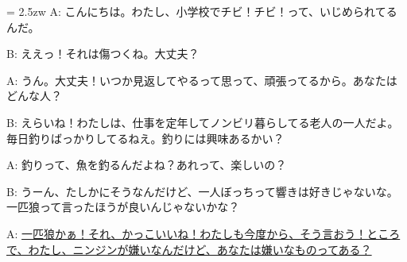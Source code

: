 \documentclass[11pt]{amsart}
\title{}
\author{}
\newenvironment{hangall}[1]{\hangindent = 2.5zw\everypar{\hangindent = 2.5zw}}{}
\begin{document}
\maketitle
\begin{hangall}{}%
A: こんにちは。わたし、小学校でチビ！チビ！って、いじめられてるんだ。

B: ええっ！それは傷つくね。大丈夫？

A: うん。大丈夫！いつか見返してやるって思って、頑張ってるから。あなたはどんな人？

B: えらいね！わたしは、仕事を定年してノンビリ暮らしてる老人の一人だよ。毎日釣りばっかりしてるねえ。釣りには興味あるかい？

A: 釣りって、魚を釣るんだよね？あれって、楽しいの？

B: うーん、たしかにそうなんだけど、一人ぼっちって響きは好きじゃないな。一匹狼って言ったほうが良いんじゃないかな？

A: \ul{一匹狼かぁ！それ、かっこいいね！わたしも今度から、そう言おう！ところで、わたし、ニンジンが嫌いなんだけど、あなたは嫌いなものってある？}\end{hangall}
\end{document}
